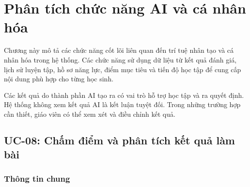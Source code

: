 \chapter{Phân tích chức năng AI và cá nhân hóa}
\label{chap:ai-personalization}

Chương này mô tả các chức năng cốt lõi liên quan đến trí tuệ nhân tạo
và cá nhân hóa trong hệ thống. Các chức năng sử dụng dữ liệu từ kết quả
đánh giá, lịch sử luyện tập, hồ sơ năng lực, điểm mục tiêu và tiến độ học
tập để cung cấp nội dung phù hợp cho từng học sinh.

Các kết quả do thành phần AI tạo ra có vai trò hỗ trợ học tập và ra quyết
định. Hệ thống không xem kết quả AI là kết luận tuyệt đối. Trong những
trường hợp cần thiết, giáo viên có thể xem xét và điều chỉnh kết quả.

\section{UC-08: Chấm điểm và phân tích kết quả làm bài}
\label{sec:uc08-score-analysis}

\subsection{Thông tin chung}

\renewcommand{\arraystretch}{1.25}

